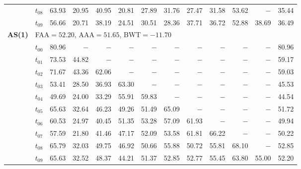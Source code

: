 \begin{table}[ht]
\begin{tabular}{@{}l l r r r r r r r r r r r@{}}
 & $t_{08}$ & 63.93 & 20.95 & 40.95 & 20.81 & 27.89 & 31.76 & 27.47 & 31.58 & 53.62 & $-$ & 35.44 \\
 & $t_{09}$ & 56.66 & 20.71 & 38.19 & 24.51 & 30.51 & 28.36 & 37.71 & 36.72 & 52.88 & 38.69 & 36.49 \\
\midrule
\multirow{11}{*}{\textbf{AS(1)}} & \multicolumn{12}{l}{\quad\small FAA$=52.20$,\; AAA$=51.65$,\; BWT$=-11.70$} \\
 & $t_{00}$ & 80.96 & $-$ & $-$ & $-$ & $-$ & $-$ & $-$ & $-$ & $-$ & $-$ & 80.96 \\
 & $t_{01}$ & 73.53 & 44.82 & $-$ & $-$ & $-$ & $-$ & $-$ & $-$ & $-$ & $-$ & 59.17 \\
 & $t_{02}$ & 71.67 & 43.36 & 62.06 & $-$ & $-$ & $-$ & $-$ & $-$ & $-$ & $-$ & 59.03 \\
 & $t_{03}$ & 53.41 & 28.50 & 36.93 & 63.30 & $-$ & $-$ & $-$ & $-$ & $-$ & $-$ & 45.53 \\
 & $t_{04}$ & 49.69 & 24.00 & 33.29 & 55.91 & 59.83 & $-$ & $-$ & $-$ & $-$ & $-$ & 44.54 \\
 & $t_{05}$ & 65.63 & 32.64 & 46.23 & 49.26 & 51.49 & 65.09 & $-$ & $-$ & $-$ & $-$ & 51.72 \\
 & $t_{06}$ & 60.53 & 24.97 & 40.45 & 51.35 & 53.28 & 57.09 & 61.93 & $-$ & $-$ & $-$ & 49.94 \\
 & $t_{07}$ & 57.59 & 21.80 & 41.46 & 47.17 & 52.09 & 53.58 & 61.81 & 66.22 & $-$ & $-$ & 50.22 \\
 & $t_{08}$ & 65.79 & 32.03 & 49.75 & 46.92 & 50.66 & 55.88 & 50.72 & 55.81 & 68.10 & $-$ & 52.85 \\
 & $t_{09}$ & 65.63 & 32.52 & 48.37 & 44.21 & 51.37 & 52.85 & 52.77 & 55.45 & 63.80 & 55.00 & 52.20 \\
\bottomrule
\end{tabular}
\end{table}


